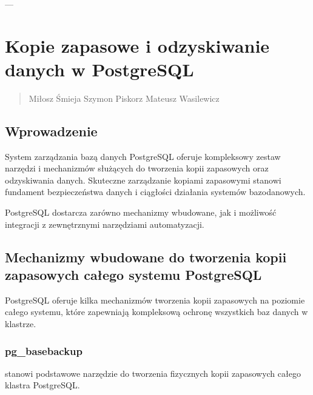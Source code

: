 \documentclass[letterpaper,10pt,polish]{sphinxmanual}
\begin{document}
\sphinxAtStartPar
—

\sphinxstepscope


\section{Kopie zapasowe i odzyskiwanie danych w PostgreSQL}
\label{\detokenize{rozdzial2/Kopie_zapasowe_i_odzyskiwanie_danych/kopie_zapasowe_i_odzyskiwanie_danych:kopie-zapasowe-i-odzyskiwanie-danych-w-postgresql}}\label{\detokenize{rozdzial2/Kopie_zapasowe_i_odzyskiwanie_danych/kopie_zapasowe_i_odzyskiwanie_danych::doc}}\begin{quote}\begin{description}
\sphinxAtStartPar
Miłosz Śmieja Szymon Piskorz Mateusz Wasilewicz

\end{description}\end{quote}


\subsection{Wprowadzenie}
\label{\detokenize{rozdzial2/Kopie_zapasowe_i_odzyskiwanie_danych/kopie_zapasowe_i_odzyskiwanie_danych:wprowadzenie}}
\sphinxAtStartPar
System zarządzania bazą danych PostgreSQL oferuje kompleksowy zestaw narzędzi i mechanizmów służących do tworzenia kopii zapasowych oraz odzyskiwania danych. Skuteczne zarządzanie kopiami zapasowymi stanowi fundament bezpieczeństwa danych i ciągłości działania systemów bazodanowych.

\sphinxAtStartPar
PostgreSQL dostarcza zarówno mechanizmy wbudowane, jak i możliwość integracji z zewnętrznymi narzędziami automatyzacji.


\subsection{Mechanizmy wbudowane do tworzenia kopii zapasowych całego systemu PostgreSQL}
\label{\detokenize{rozdzial2/Kopie_zapasowe_i_odzyskiwanie_danych/kopie_zapasowe_i_odzyskiwanie_danych:mechanizmy-wbudowane-do-tworzenia-kopii-zapasowych-calego-systemu-postgresql}}
\sphinxAtStartPar
PostgreSQL oferuje kilka mechanizmów tworzenia kopii zapasowych na poziomie całego systemu, które zapewniają kompleksową ochronę wszystkich baz danych w klastrze.


\subsubsection{pg\_basebackup}
\label{\detokenize{rozdzial2/Kopie_zapasowe_i_odzyskiwanie_danych/kopie_zapasowe_i_odzyskiwanie_danych:pg-basebackup}}
\sphinxAtStartPar
{} stanowi podstawowe narzędzie do tworzenia fizycznych kopii zapasowych całego klastra PostgreSQL.
\end{document}
